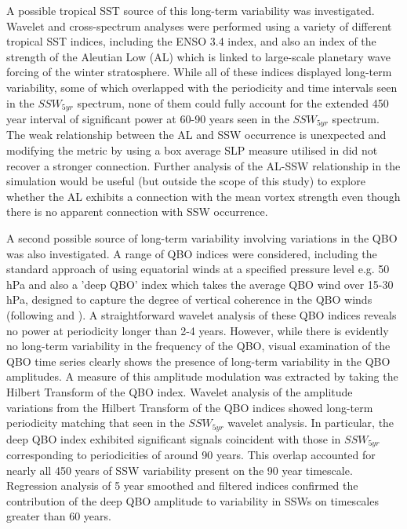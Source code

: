 \documentclass[wcd, manuscript]{copernicus}
\begin{document}
A possible tropical SST source of this long-term variability was investigated. Wavelet and cross-spectrum analyses were performed using a variety of different tropical SST indices, including the ENSO 3.4 index, and also an index of the strength of the Aleutian Low (AL) which is linked to large-scale planetary wave forcing of the winter stratosphere. While all of these indices displayed long-term variability, some of which overlapped with the periodicity and time intervals seen in the $SSW_{5yr}$ spectrum, none of them could fully account for the extended 450 year interval of significant power at 60-90 years seen in the $SSW_{5yr}$ spectrum. The weak relationship between the AL and SSW occurrence is unexpected and modifying the metric by using a box average SLP measure utilised in \cite{Garfinkel2012whymight} did not recover a stronger connection. Further analysis of the AL-SSW relationship in the simulation would be useful (but outside the scope of this study) to explore whether the AL exhibits a connection with the mean vortex strength even though there is no apparent connection with SSW occurrence. 


A second possible source of long-term variability involving variations in the QBO was also investigated. A range of QBO indices were considered, including the standard approach of using equatorial winds at a specified pressure level e.g. 50 hPa and also a 'deep QBO'  index which takes the average QBO wind over 15-30 hPa, designed to capture the degree of vertical coherence in the QBO winds (following \cite{Gray2018} and \cite{Andrews2019}). A straightforward wavelet analysis of these QBO indices reveals no power at periodicity longer than 2-4 years. However, while there is evidently no long-term variability in the frequency of the QBO, visual examination of the QBO time series clearly shows the presence of  long-term variability in the QBO amplitudes. A measure of this amplitude modulation was extracted by taking the Hilbert Transform of the QBO index. Wavelet analysis of the amplitude variations from the Hilbert Transform of the QBO indices showed long-term periodicity matching that seen in the $SSW_{5yr}$ wavelet analysis. In particular, the deep QBO index exhibited significant signals coincident with those in $SSW_{5yr}$ corresponding to periodicities of around 90 years. This overlap accounted for nearly all 450 years of SSW variability present on the 90 year timescale. Regression analysis of 5 year smoothed and filtered indices confirmed the contribution of the deep QBO amplitude to variability in SSWs on timescales greater than 60 years. 
\end{document}

